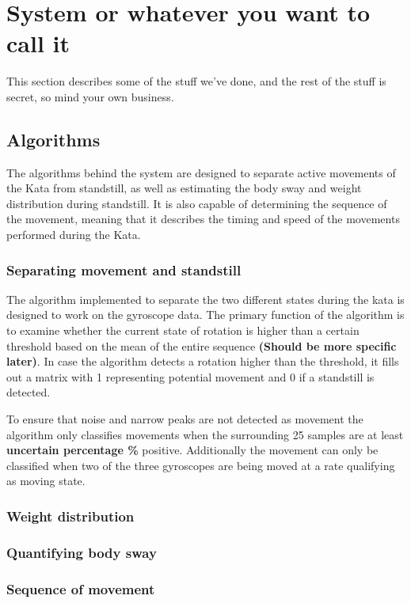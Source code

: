 \section{System or whatever you want to call it}

This section describes some of the stuff we've done, and the rest of the stuff is secret, so mind your own business.

\subsection{Algorithms}

The algorithms behind the system are designed to separate active movements of the Kata from standstill, as well as estimating the body sway and weight distribution during standstill. It is also capable of determining the sequence of the movement, meaning that it describes the timing and speed of the movements performed during the Kata. 

\subsubsection{Separating movement and standstill}

The algorithm implemented to separate the two different states during the kata is designed to work on the gyroscope data. The primary function of the algorithm is to examine whether the current state of rotation is higher than a certain threshold based on the mean of the entire sequence \textbf{(Should be more specific later)}. In case the algorithm detects a rotation higher than the threshold, it fills out a matrix with 1 representing potential movement and 0 if a standstill is detected. 

To ensure that noise and narrow peaks are not detected as movement the algorithm only classifies movements when the surrounding 25 samples are at least \textbf{uncertain percentage \%} positive. Additionally the movement can only be classified when two of the three gyroscopes are being moved at a rate qualifying as moving state.

\subsubsection{Weight distribution}

\subsubsection{Quantifying body sway}

\subsubsection{Sequence of movement}